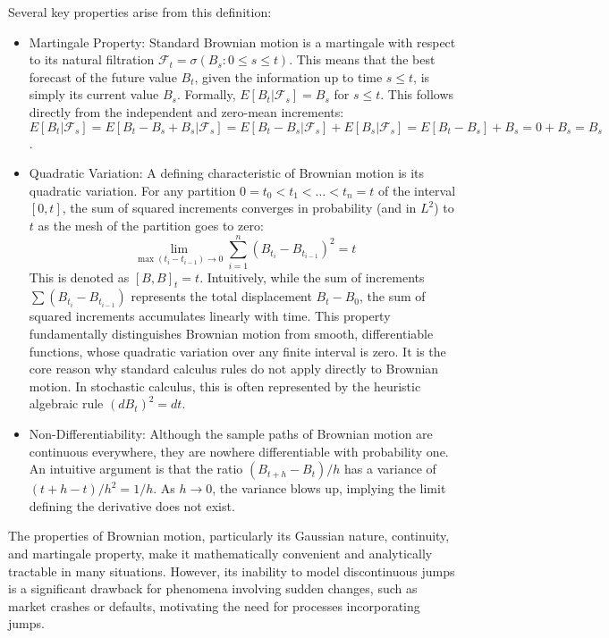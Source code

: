 \documentclass[11pt,twoside,openright]{report}
\begin{document}
Several key properties arise from this definition:
\begin{itemize}
    \item Martingale Property: Standard Brownian motion is a martingale with respect to its natural filtration $\mathcal{F}_t = \sigma(B_s : 0 \le s \le t)$. This means that the best forecast of the future value $B_t$, given the information up to time $s \le t$, is simply its current value $B_s$. Formally, $E[B_t | \mathcal{F}_s] = B_s$ for $s \le t$. This follows directly from the independent and zero-mean increments: $E[B_t | \mathcal{F}_s] = E[B_t - B_s + B_s | \mathcal{F}_s] = E[B_t - B_s | \mathcal{F}_s] + E[B_s | \mathcal{F}_s] = E[B_t - B_s] + B_s = 0 + B_s = B_s$.
    \item Quadratic Variation: A defining characteristic of Brownian motion is its quadratic variation. For any partition $0 = t_0 < t_1 < \dots < t_n = t$ of the interval $[0, t]$, the sum of squared increments converges in probability (and in $L^2$) to $t$ as the mesh of the partition goes to zero:
    \[ \lim_{\max(t_i - t_{i-1}) \to 0} \sum_{i=1}^n (B_{t_i} - B_{t_{i-1}})^2 = t \]
    This is denoted as $[B, B]_t = t$. Intuitively, while the sum of increments $\sum (B_{t_i} - B_{t_{i-1}})$ represents the total displacement $B_t - B_0$, the sum of squared increments accumulates linearly with time. This property fundamentally distinguishes Brownian motion from smooth, differentiable functions, whose quadratic variation over any finite interval is zero. It is the core reason why standard calculus rules do not apply directly to Brownian motion. In stochastic calculus, this is often represented by the heuristic algebraic rule $(dB_t)^2 = dt$.
    \item Non-Differentiability: Although the sample paths of Brownian motion are continuous everywhere, they are nowhere differentiable with probability one. An intuitive argument is that the ratio $(B_{t+h} - B_t)/h$ has a variance of $(t+h-t)/h^2 = 1/h$. As $h \to 0$, the variance blows up, implying the limit defining the derivative does not exist.
\end{itemize}
The properties of Brownian motion, particularly its Gaussian nature, continuity, and martingale property, make it mathematically convenient and analytically tractable in many situations. However, its inability to model discontinuous jumps is a significant drawback for phenomena involving sudden changes, such as market crashes or defaults, motivating the need for processes incorporating jumps.
\end{document}
